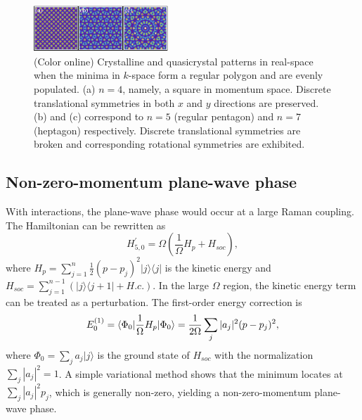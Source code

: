 \documentclass[twocolumn,prl,floatfix,citeautoscript,nofootinbib]{revtex4}
\begin{document}
\begin{figure}[t]
\centering
\includegraphics[width=0.45\textwidth]{FigS1.png}
\caption{(Color online) Crystalline and quasicrystal patterns in real-space
when the minima in $k$-space form a regular polygon and are evenly
populated. (a) $n=4$, namely, a square in momentum space. Discrete
translational symmetries in both $x$ and $y$ directions are preserved. (b)
and (c) correspond to $n=5$ (regular pentagon) and $n=7$ (heptagon)
respectively. Discrete translational symmetries are broken and corresponding
rotational symmetries are exhibited.}
\label{figS1}
\end{figure}

\subsection{Non-zero-momentum plane-wave phase}

With interactions, the plane-wave phase would occur at a large Raman
coupling. The Hamiltonian can be rewritten as
\begin{equation}
H_{5,0}^{\prime }=\Omega \left( \frac{1}{\Omega }H_{p}+H_{soc}\right) ,
\end{equation}%
where $H_{p}=\sum_{j=1}^{n}\frac{1}{2}(p-p_{j})^{2}|j\rangle \langle j|$ is
the kinetic energy and $H_{soc}=\sum_{j=1}^{n-1}\left( |j\rangle \langle
j+1|+H.c.\right) $. In the large $\Omega $ region, the kinetic energy term
can be treated as a perturbation. The first-order energy correction is
\begin{equation}
E_{0}^{(1)}=\langle \Phi _{0}|\frac{1}{\Omega }H_{p}|\Phi _{0}\rangle =\frac{%
1}{2\Omega }\sum_{j}|a_{j}|^{2}(p-p_{j})^{2},
\end{equation}%
where $\Phi _{0}=\sum_{j}a_{j}|j\rangle $ is the ground state of $H_{soc}$
with the normalization $\sum_{j}|a_{j}|^{2}=1$. A simple variational method
shows that the minimum locates at $\sum_{j}|a_{j}|^{2}p_{j}$, which is
generally non-zero, yielding a non-zero-momentum plane-wave phase.
\end{document}
